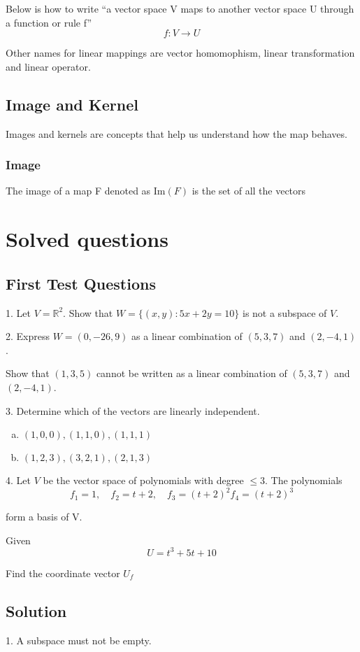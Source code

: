 \documentclass{book}
\begin{document}
Below is how to write ``a vector space V maps to another vector space U through a function or rule f''
\[f: V \to U\]

Other names for linear mappings are vector homomophism, linear transformation and linear operator.

\section{Image and Kernel}
Images and kernels are concepts that help us understand how the map behaves.

\subsection{Image}
The image of a map F denoted as \(\text{Im}(F)\) is the set of all the vectors 
\chapter{Solved questions}
\section{First Test Questions}

1. Let \( V = \mathbb{R}^2 \). Show that \( W = \{(x, y) : 5x + 2y = 10\} \) is not a subspace of \( V \).

2. Express \( W = (0, -26, 9) \) as a linear combination of \( (5, 3, 7) \) and \( (2, -4, 1) \).

   Show that \( (1, 3, 5) \) cannot be written as a linear combination of \( (5, 3, 7) \) and \( (2, -4, 1) \).

3. Determine which of the vectors are linearly independent.
   \begin{enumerate}[(a)]
      \item \( (1, 0, 0), (1, 1, 0), (1, 1, 1) \)
       \item \( (1, 2, 3), (3, 2, 1), (2, 1, 3) \)
   \end{enumerate}

4. Let \( V \) be the vector space of polynomials with degree \(\leq 3\). The polynomials
\[f_1 = 1, \quad f_2 = t + 2, \quad f_3 = {(t + 2)}^2
f_4 = {(t + 2)}^3\]

form a basis of V.

Given \[U = t^3 + 5t + 10\]

Find the coordinate vector \(U_f\)

\section*{Solution}
1. A subspace must not be empty.
\end{document}
